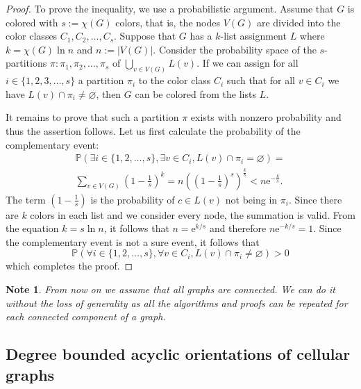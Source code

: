\documentclass[a4paper, 12pt]{article}
\newtheorem{note}[lem]{Note}
\begin{document}
\begin{proof} To prove the inequality, we use a probabilistic argument. Assume that $G$ is colored with $s := \chi(G)$ colors, that is, the nodes $V(G)$ are divided into the color classes $C_1, C_2, \ldots, C_s$. Suppose that $G$ has a $k$-list assignment $L$ where $k = \chi(G) \ln{n}$ and $n := |V(G)|.$ Consider the probability space of the $s$-partitions $\pi \colon \pi_{1},\pi_{2},\ldots,\pi_{s}$ of $\bigcup_{v \in V(G)} L(v).$ If we can assign for all $i \in \lbrace 1,2,3,\dots,s \rbrace$ a partition $\pi_i$ to the color class $C_i$ such that for all $v \in C_i$ we have $L(v) \cap \pi_i \neq \varnothing$, then $G$ can be colored from the lists $L$. 

It remains to prove that such a partition $\pi$ exists with nonzero probability and thus the assertion follows. Let us first calculate the probability of the complementary event:
\begin{equation*}
\begin{split}
\mathbb{P}(\exists i \in \lbrace 1,2,\ldots, s \rbrace, \exists v \in C_i, L(v) \cap \pi_i = \varnothing) = \\
\sum_{v \in V(G)}\left( 1 - \frac{1}{s} \right)^k = n \left(\left(1 - \frac{1}{s} \right)^s \right)^{\frac{k}{s}} < n\mathrm{e}^{-\frac{k}{s}}.
\end{split}
\end{equation*}
The term $\left( 1 - \frac{1}{s} \right)$ is the probability of $c \in L(v)$ not being in $\pi_i.$ Since there are $k$ colors in each list and we consider every node, the summation is valid. From the equation $k = s \ln{n}$, it follows that $n = \mathrm{e}^{k/s}$ and therefore $n\mathrm{e}^{-k/s} = 1.$ Since the complementary event is not a sure event, it follows that
$$
\mathbb{P}(\forall i \in \lbrace 1,2,\ldots, s \rbrace, \forall v \in C_i, L(v) \cap \pi_i \neq \varnothing) > 0
$$
which completes the proof.
\end{proof}
\begin{note}From now on we assume that all graphs are connected. We can do it without the loss of generality as all the algorithms and proofs can be repeated for each connected component of a graph.\end{note}

\subsection{Degree bounded acyclic orientations of cellular graphs}\label{sec:orientation}
\end{document}
